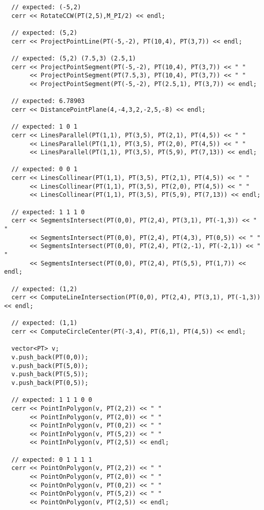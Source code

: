 \begin{lstlisting}
  // expected: (-5,2)
  cerr << RotateCCW(PT(2,5),M_PI/2) << endl;
  
  // expected: (5,2)
  cerr << ProjectPointLine(PT(-5,-2), PT(10,4), PT(3,7)) << endl;
  
  // expected: (5,2) (7.5,3) (2.5,1)
  cerr << ProjectPointSegment(PT(-5,-2), PT(10,4), PT(3,7)) << " "
       << ProjectPointSegment(PT(7.5,3), PT(10,4), PT(3,7)) << " "
       << ProjectPointSegment(PT(-5,-2), PT(2.5,1), PT(3,7)) << endl;
  
  // expected: 6.78903
  cerr << DistancePointPlane(4,-4,3,2,-2,5,-8) << endl;
  
  // expected: 1 0 1
  cerr << LinesParallel(PT(1,1), PT(3,5), PT(2,1), PT(4,5)) << " "
       << LinesParallel(PT(1,1), PT(3,5), PT(2,0), PT(4,5)) << " "
       << LinesParallel(PT(1,1), PT(3,5), PT(5,9), PT(7,13)) << endl;
  
  // expected: 0 0 1
  cerr << LinesCollinear(PT(1,1), PT(3,5), PT(2,1), PT(4,5)) << " "
       << LinesCollinear(PT(1,1), PT(3,5), PT(2,0), PT(4,5)) << " "
       << LinesCollinear(PT(1,1), PT(3,5), PT(5,9), PT(7,13)) << endl;
  
  // expected: 1 1 1 0
  cerr << SegmentsIntersect(PT(0,0), PT(2,4), PT(3,1), PT(-1,3)) << " "
       << SegmentsIntersect(PT(0,0), PT(2,4), PT(4,3), PT(0,5)) << " "
       << SegmentsIntersect(PT(0,0), PT(2,4), PT(2,-1), PT(-2,1)) << " "
       << SegmentsIntersect(PT(0,0), PT(2,4), PT(5,5), PT(1,7)) << endl;
  
  // expected: (1,2)
  cerr << ComputeLineIntersection(PT(0,0), PT(2,4), PT(3,1), PT(-1,3)) << endl;
  
  // expected: (1,1)
  cerr << ComputeCircleCenter(PT(-3,4), PT(6,1), PT(4,5)) << endl;
  
  vector<PT> v; 
  v.push_back(PT(0,0));
  v.push_back(PT(5,0));
  v.push_back(PT(5,5));
  v.push_back(PT(0,5));
  
  // expected: 1 1 1 0 0
  cerr << PointInPolygon(v, PT(2,2)) << " "
       << PointInPolygon(v, PT(2,0)) << " "
       << PointInPolygon(v, PT(0,2)) << " "
       << PointInPolygon(v, PT(5,2)) << " "
       << PointInPolygon(v, PT(2,5)) << endl;
  
  // expected: 0 1 1 1 1
  cerr << PointOnPolygon(v, PT(2,2)) << " "
       << PointOnPolygon(v, PT(2,0)) << " "
       << PointOnPolygon(v, PT(0,2)) << " "
       << PointOnPolygon(v, PT(5,2)) << " "
       << PointOnPolygon(v, PT(2,5)) << endl;
  

\end{lstlisting}
